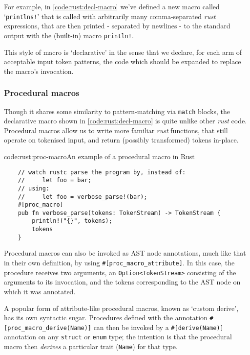 For example, in \cref{code:rust:decl-macro} we've defined a new macro called `\texttt{printlns!}' that is called with arbitrarily many comma-separated \emph{rust} expressions, that are then printed - separated by newlines - to the standard output with the (built-in) macro \texttt{println!}. \cite{rust_rfc1584}

This style of macro is `declarative' in the sense that we declare, for each arm of acceptable input token patterns, the code which should be expanded to replace the macro's invocation.

\subsubsection{Procedural macros} \label{bg:rust:proc-macros}

Though it shares some similarity to pattern-matching via \texttt{match} blocks, the declarative macro shown in \cref{code:rust:decl-macro} is quite unlike other \emph{rust} code. Procedural macros allow us to write more familiar \emph{rust} functions, that still operate on tokenised input, and return (possibly transformed) tokens in-place.

\begin{codelisting}{code:rust:proc-macro}{An example of a procedural macro in Rust}
\begin{verbatim}
	// watch rustc parse the program by, instead of:
	//     let foo = bar;
	// using:
	//     let foo = verbose_parse!(bar);
	#[proc_macro]
	pub fn verbose_parse(tokens: TokenStream) -> TokenStream {
	    println!("{}", tokens);
	    tokens
	}
\end{verbatim}	
\end{codelisting}

Procedural macros can also be invoked as AST node annotations, much like that in their own definition, by using \texttt{#[proc_macro_attribute]}. In this case, the procedure receives two arguments, an \texttt{Option<TokenStream>} consisting of the arguments to its invocation, and the tokens corresponding to the AST node on which it was annotated. \cite{rust_rfc1566}

A popular form of attribute-like procedural macros, known as `custom derive', has its own syntactic sugar. Procedures defined with the annotation \texttt{#[proc_macro_derive(Name)]} can then be invoked by a \texttt{#[derive(Name)]} annotation on any \texttt{struct} or \texttt{enum} type; the intention is that the procedural macro then \emph{derives} a particular trait (\texttt{Name}) for that type.

